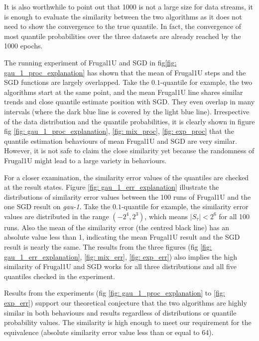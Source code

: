 It is also worthwhile to point out that 1000 is not a large size for data streams, it is enough to evaluate the similarity between the two algorithms as it does not need to show the convergence to the true quantile. In fact, the convergence of most quantile probabilities over the three datasets are already reached by the 1000 epochs.

The running experiment of Frugal1U and SGD in fig\ref{fig: gau_1_proc_explanation} has shown that the mean of Frugal1U steps and the SGD functions are largely overlapped. Take the $0.1$-quantile for example, the two algorithms start at the same point, and the mean Frugal1U line shares similar trends and close quantile estimate position with SGD. They even overlap in many intervals (where the dark blue line is covered by the light blue line).
Irrespective of the data distribution and the quantile probabilities, it is clearly shown in figure fig \ref{fig: gau_1_proc_explanation}, \ref{fig: mix_proc}, \ref{fig: exp_proc} that the quantile estimation behaviours of mean Frugal1U and SGD are very similar. However, it is not safe to claim the close similarity yet because the randomness of Frugal1U might lead to a large variety in behaviours.

For a closer examination, the similarity error values of the quantiles are checked at the result states. Figure \ref{fig: gau_1_err_explanation} illustrate the distributions of similarity error values between the 100 runs of Frugal1U and the one SGD result on \textit{gau-1}. Take the 0$.1$-quantile for example, the similarity error values are distributed in the range $(-2^4, 2^3)$, which means $|S_\tau| < 2^6$ for all 100 runs. Also the mean of the similarity error (the centred black line) has an absolute value less than 1, indicating the mean Frugal1U result and the SGD result is nearly the same. The results from the three figures (fig \ref{fig: gau_1_err_explanation}, \ref{fig: mix_err}, \ref{fig: exp_err}) also implies the high similarity of Frugal1U and SGD works for all three distributions and all five quantiles checked in the experiment.

Results from the experiments (fig \ref{fig: gau_1_proc_explanation} to \ref{fig: exp_err}) support our theoretical conjecture that the two algorithms are highly similar in both behaviours and results regardless of distributions or quantile probability values. The similarity is high enough to meet our requirement for the equivalence (absolute similarity error value less than or equal to 64).


